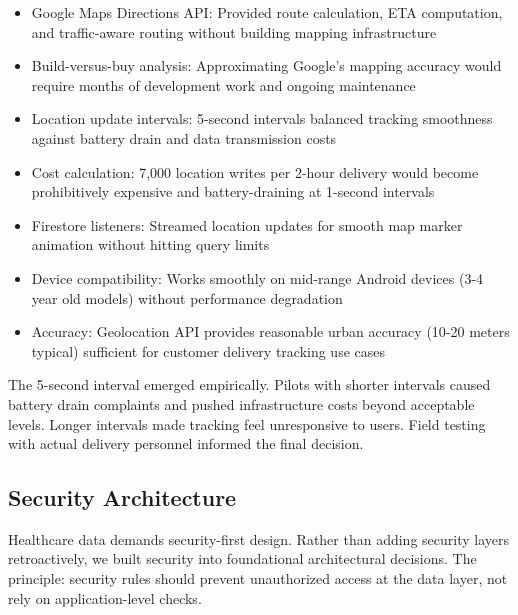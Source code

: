 \documentclass[12pt,a4paper]{report}
\begin{document}
\begin{itemize}
  \item Google Maps Directions API: Provided route calculation, ETA computation, and traffic-aware routing without building mapping infrastructure
  \item Build-versus-buy analysis: Approximating Google's mapping accuracy would require months of development work and ongoing maintenance
  \item Location update intervals: 5-second intervals balanced tracking smoothness against battery drain and data transmission costs
  \item Cost calculation: 7,000 location writes per 2-hour delivery would become prohibitively expensive and battery-draining at 1-second intervals
  \item Firestore listeners: Streamed location updates for smooth map marker animation without hitting query limits
  \item Device compatibility: Works smoothly on mid-range Android devices (3-4 year old models) without performance degradation
  \item Accuracy: Geolocation API provides reasonable urban accuracy (10-20 meters typical) sufficient for customer delivery tracking use cases
\end{itemize}

The 5-second interval emerged empirically. Pilots with shorter intervals caused battery drain complaints and pushed infrastructure costs beyond acceptable levels. Longer intervals made tracking feel unresponsive to users. Field testing with actual delivery personnel informed the final decision.

\subsection{Security Architecture}

Healthcare data demands security-first design. Rather than adding security layers retroactively, we built security into foundational architectural decisions. The principle: security rules should prevent unauthorized access at the data layer, not rely on application-level checks.
\end{document}
